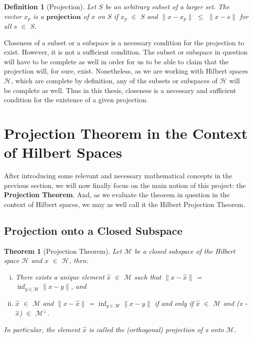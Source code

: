 \documentclass{article}
\newtheorem{defn}{Definition}
\newtheorem{thm}{Theorem}
\begin{document}
\begin{defn}[Projection]
Let $S$ be an arbitrary subset of a larger set. The vector $x_p$ is a $\textbf{projection}$ of $x$ on $S$ if $x_p$ $\in$ $S$ and $\lVert x - x_p\rVert$ $\leqslant$ $\lVert x - s\rVert$ for all $s$ $\in$ $S$.
\end{defn}
Closeness of a subset or a subspace is a necessary condition for the projection to exist. However, it is not a sufficient condition. The subset or subspace in question will have to be complete as well in order for us to be able to claim that the projection will, for sure, exist. Nonetheless, as we are working with Hilbert spaces $\mathscr{H}$, which are complete by definition, any of the subsets or subspaces of $\mathscr{H}$ will be complete as well. Thus in this thesis, closeness is a necessary and sufficient condition for the existence of a given projection.

\newpage

\section{Projection Theorem in the Context of Hilbert Spaces}

After introducing some relevant and necessary mathematical concepts in the previous section, we will now finally focus on the main notion of this project: the \textbf{Projection Theorem}. And, as we evaluate the theorem in question in the context of Hilbert spaces, we may as well call it the Hilbert Projection Theorem.

\subsection{Projection onto a Closed Subspace}

\begin{thm}[Projection Theorem]\label{thm:prj}
Let $\mathscr{M}$ be a closed subspace of the Hilbert space $\mathscr{H}$ and $x$ $\in$ $\mathscr{H}$, then: 
\begin{enumerate}[(i)]
   \item There exists a unique element $\hat{x}$ $\in$ $\mathscr{M}$ such that $\lVert x - \hat{x}\rVert$ = $\inf_{y \in \mathscr{M}} \lVert x - y \rVert$, and
   \item $\hat{x}$ $\in$ $\mathscr{M}$ and $\lVert x - \hat{x}\rVert$ = $\inf_{y \in \mathscr{M}} \lVert x - y \rVert$ if and only if $\hat{x}$ $\in$ $\mathscr{M}$ and (x - $\hat{x}$) $\in$ $\mathscr{M^\bot}$. 
\end{enumerate}
In particular, the element $\hat{x}$ is called the (orthogonal) projection of x onto $\mathscr{M}$.
\end{thm}
\end{document}
